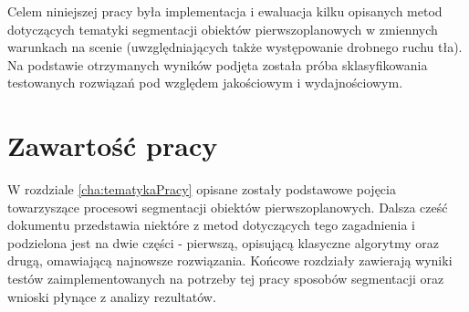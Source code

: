 Celem niniejszej pracy była implementacja i ewaluacja kilku opisanych metod dotyczących tematyki segmentacji obiektów pierwszoplanowych w zmiennych warunkach na scenie (uwzględniających także występowanie drobnego ruchu tła). Na podstawie otrzymanych wyników podjęta została próba sklasyfikowania testowanych rozwiązań pod względem jakościowym i wydajnościowym.



\section{Zawartość pracy}
\label{sec:zawartoscPracy}

W rozdziale \ref{cha:tematykaPracy} opisane zostały podstawowe pojęcia towarzyszące procesowi segmentacji obiektów pierwszoplanowych. Dalsza cześć dokumentu przedstawia niektóre z metod dotyczących tego zagadnienia i podzielona jest na dwie części - pierwszą, opisującą klasyczne algorytmy oraz drugą, omawiającą najnowsze rozwiązania. Końcowe rozdziały zawierają wyniki testów zaimplementowanych na potrzeby tej pracy sposobów segmentacji oraz wnioski płynące z analizy rezultatów.




